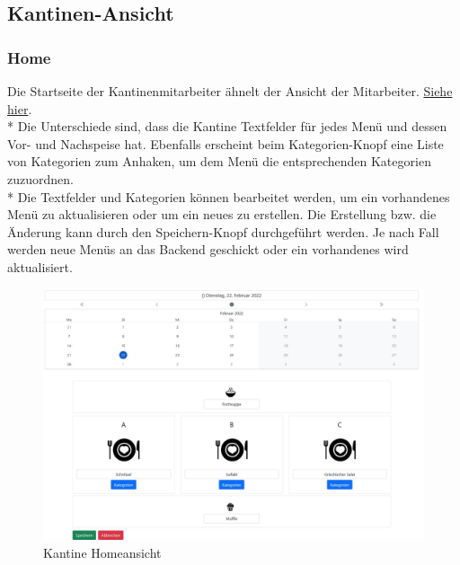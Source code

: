 \pagebreak

\subsection {Kantinen-Ansicht}
\subsubsection {Home}

Die Startseite der Kantinenmitarbeiter ähnelt der Ansicht der Mitarbeiter. \hyperref[sec:MitHome]{Siehe hier}. \\*
Die Unterschiede sind, dass die Kantine Textfelder für jedes Menü und dessen Vor- und Nachspeise hat.
Ebenfalls erscheint beim Kategorien-Knopf eine Liste von Kategorien zum Anhaken, um dem Menü die entsprechenden Kategorien zuzuordnen. \\*
Die Textfelder und Kategorien können bearbeitet werden, um ein vorhandenes Menü zu aktualisieren oder um ein neues zu erstellen.
Die Erstellung bzw. die Änderung kann durch den Speichern-Knopf durchgeführt werden. Je nach Fall werden neue Menüs an das Backend geschickt oder ein
vorhandenes wird aktualisiert.

\begin{figure}[htp]
    \centering
    \includegraphics[scale=0.35]{pics/kantine_home.JPG}
    \caption{Kantine Homeansicht}
    \label{fig:impl:CantineHome}
\end{figure}

